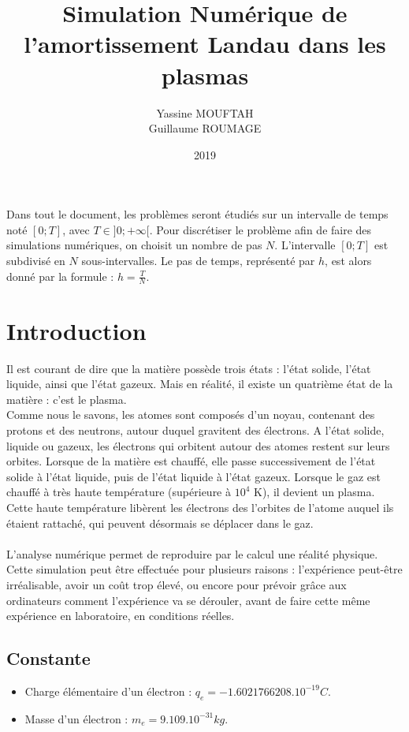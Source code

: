 \documentclass{article}
\title{Simulation Numérique de l'amortissement Landau dans les plasmas}
\date{2019}
\author{Yassine MOUFTAH\\Guillaume ROUMAGE}
\begin{document}
\maketitle
\newpage
\noindent Dans tout le document, les problèmes seront étudiés sur un intervalle de temps noté $[0;T]$, avec $T \in ]0; + \infty[$. Pour discrétiser le problème afin de faire des simulations numériques, on choisit un nombre de pas $N$. L'intervalle $[0;T]$ est subdivisé en $N$ sous-intervalles. Le pas de temps, représenté par $h$, est alors donné par la formule : $h = \frac{T}{N}$.
\newpage
\section*{Introduction}
Il est courant de dire que la matière possède trois états : l'état solide, l'état liquide, ainsi que l'état gazeux. Mais en réalité, il existe un quatrième état de la matière : c'est le plasma.\\
Comme nous le savons, les atomes sont composés d'un noyau, contenant des protons et des neutrons, autour duquel gravitent des électrons. A l'état solide, liquide ou gazeux, les électrons qui orbitent autour des atomes restent sur leurs orbites. Lorsque de la matière est chauffé, elle passe successivement de l'état solide à l'état liquide, puis de l'état liquide à l'état gazeux. Lorsque le gaz est chauffé à très haute température (supérieure à $10^4$ K), il devient un plasma.\\
Cette haute température libèrent les électrons des l'orbites de l'atome auquel ils étaient rattaché, qui peuvent désormais se déplacer dans le gaz.\\
\\
L'analyse numérique permet de reproduire par le calcul une réalité physique. Cette simulation peut être effectuée pour plusieurs raisons : l'expérience peut-être irréalisable, avoir un coût trop élevé, ou encore pour prévoir grâce aux ordinateurs comment l'expérience va se dérouler, avant de faire cette même expérience en laboratoire, en conditions réelles.
\subsection*{Constante}
\begin{itemize}
\item Charge élémentaire d'un électron : $q_e = -1.6021766208.10^{-19} C$.
\item Masse d'un électron : $m_e = 9.109.10^{-31} kg$.
\end{itemize}
\end{document}
